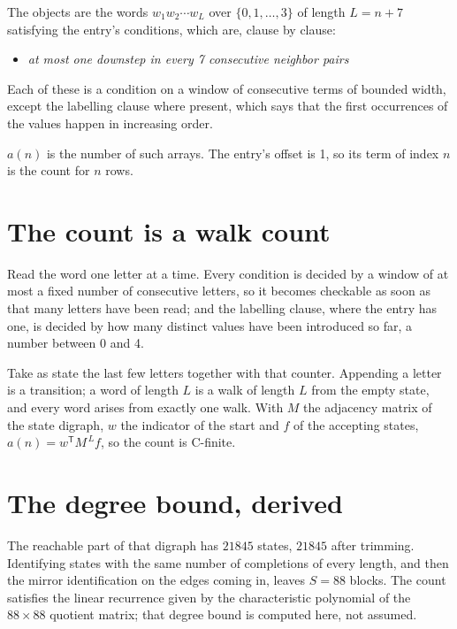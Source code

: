 \documentclass[11pt]{article}
\theoremstyle{definition}
\begin{document}
The objects are the words $w_1 w_2 \cdots w_L$ over $\{0,1,\dots,3\}$ of length $L = n + 7$ satisfying the entry's conditions, which are, clause by clause:

\begin{itemize}

\item {\itshape at most one downstep in every 7 consecutive neighbor pairs}

\end{itemize}

Each of these is a condition on a window of consecutive terms of bounded width, except the labelling clause where present, which says that the first occurrences of the values happen in increasing order.

$a(n)$ is the number of such arrays. The entry's offset is 1, so its term of index $n$ is the count for $n$ rows.

\section{The count is a walk count}

Read the word one letter at a time. Every condition is decided by a window of at most a fixed number of consecutive letters, so it becomes checkable as soon as that many letters have been read; and the labelling clause, where the entry has one, is decided by how many distinct values have been introduced so far, a number between $0$ and 4.

Take as state the last few letters together with that counter. Appending a letter is a transition; a word of length $L$ is a walk of length $L$ from the empty state, and every word arises from exactly one walk. With $M$ the adjacency matrix of the state digraph, $w$ the indicator of the start and $f$ of the accepting states, $a(n) = w^{\mathsf T}M^{\,L}f$, so the count is C-finite.

\section{The degree bound, derived}

The reachable part of that digraph has $21845$ states, $21845$ after trimming. Identifying states with the same number of completions of every length, and then the mirror identification on the edges coming in, leaves $S = 88$ blocks. The count satisfies the linear recurrence given by the characteristic polynomial of the $88\times88$ quotient matrix; that degree bound is computed here, not assumed.
\end{document}
